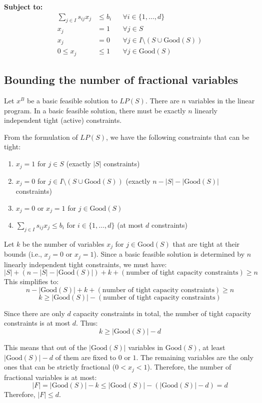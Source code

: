 \textbf{Subject to:}
\begin{align*}
    \sum_{j \in I} s_{ij} x_j &\leq b_i && \forall i \in \{1, \ldots, d\} \\
    x_j &= 1 && \forall j \in S \\
    x_j &= 0 && \forall j \in I \setminus (S \cup \text{Good}(S)) \\
    0 \leq x_j &\leq 1 && \forall j \in \text{Good}(S)
\end{align*}


\subsection*{Bounding the number of fractional variables}
Let $x^B$ be a basic feasible solution to $LP(S)$. There are $n$ variables in the linear program. In a basic feasible solution, there must be exactly $n$ linearly independent tight (active) constraints.

From the formulation of $LP(S)$, we have the following constraints that can be tight:
\begin{enumerate}
    \item $x_j = 1$ for $j \in S$ (exactly $|S|$ constraints)
    \item $x_j = 0$ for $j \in I \setminus (S \cup \text{Good}(S))$ (exactly $n - |S| - |\text{Good}(S)|$ constraints)
    \item $x_j = 0$ or $x_j = 1$ for $j \in \text{Good}(S)$
    \item $\sum_{j \in I} s_{ij} x_j \leq b_i$ for $i \in \{1, \ldots, d\}$ (at most $d$ constraints)
\end{enumerate}

Let $k$ be the number of variables $x_j$ for $j \in \text{Good}(S)$ that are tight at their bounds (i.e., $x_j = 0$ or $x_j = 1$).
Since a basic feasible solution is determined by $n$ linearly independent tight constraints, we must have:
\[ |S| + (n - |S| - |\text{Good}(S)|) + k + (\text{number of tight capacity constraints}) \geq n \]
This simplifies to:
\[ n - |\text{Good}(S)| + k + (\text{number of tight capacity constraints}) \geq n \]
\[ k \geq |\text{Good}(S)| - (\text{number of tight capacity constraints}) \]

Since there are only $d$ capacity constraints in total, the number of tight capacity constraints is at most $d$. Thus:
\[ k \geq |\text{Good}(S)| - d \]

This means that out of the $|\text{Good}(S)|$ variables in $\text{Good}(S)$, at least $|\text{Good}(S)| - d$ of them are fixed to $0$ or $1$. The remaining variables are the only ones that can be strictly fractional ($0 < x_j < 1$).
Therefore, the number of fractional variables is at most:
\[ |F| = |\text{Good}(S)| - k \leq |\text{Good}(S)| - (|\text{Good}(S)| - d) = d \]
Therefore, $|F| \leq d$.
